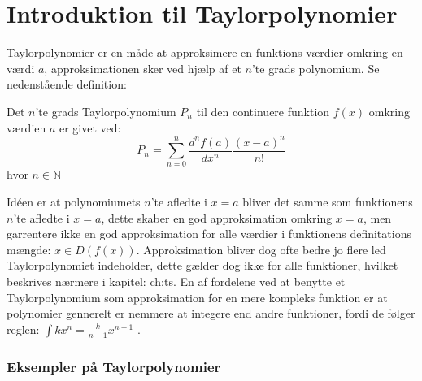\chapter{Introduktion til Taylorpolynomier}
\label{ch:tp}
Taylorpolynomier er en måde at approksimere en funktions værdier omkring en værdi $a$, 
approksimationen sker ved hjælp af et $n$'te grads polynomium. Se nedenstående definition: 
\begin{defn}
    Det $n$'te grads Taylorpolynomium $P_n$ til den continuere funktion $f(x)$ omkring værdien $a$ er givet ved:
    \[
    P_n = \sum^{n}_{n=0} \frac{d^n f(a)}{dx^n}\frac{(x-a)^{n}}{n!}
    \]
    hvor $n \in \mathbb{N}$
\end{defn}
\label{def:taylorPolynomium}
Idéen er at polynomiumets $n$'te afledte i $x = a$ bliver det samme som funktionens $n$'te afledte i $x = a$, 
dette skaber en god approksimation omkring $x = a$, men garrentere ikke en god approksimation 
for alle værdier i funktionens definitations mængde: $x \in D(f(x))$. Approksimation bliver dog ofte bedre jo 
flere led Taylorpolynomiet indeholder, dette gælder dog ikke for alle funktioner, hvilket beskrives nærmere i kapitel: \refname{ch:ts}. 
En af fordelene ved at benytte et Taylorpolynomium som approksimation for en mere kompleks funktion
er at polynomier gennerelt er nemmere at integere end andre funktioner, fordi de følger reglen: $\int k x^n = \frac{k}{n + 1}x^{n + 1}$ .


\subsection*{Eksempler på Taylorpolynomier}
